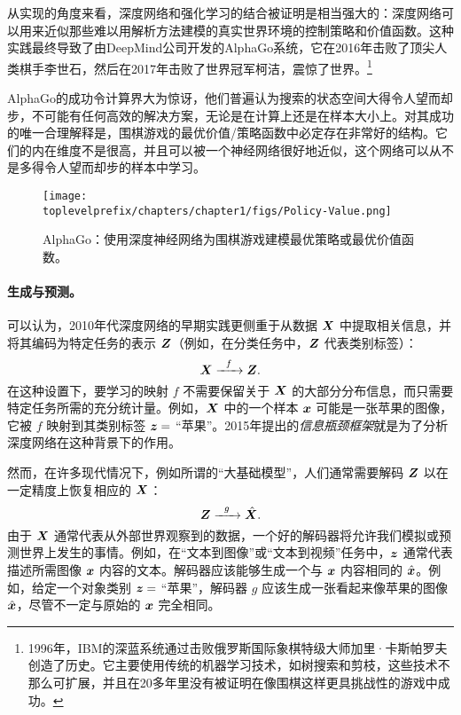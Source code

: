 \documentclass[../../book-main.tex]{subfiles}
\begin{document}
从实现的角度来看，深度网络和强化学习的结合被证明是相当强大的：深度网络可以用来近似那些难以用解析方法建模的真实世界环境的控制策略和价值函数。这种实践最终导致了由DeepMind公司开发的AlphaGo系统，它在2016年击败了顶尖人类棋手李世石，然后在2017年击败了世界冠军柯洁，震惊了世界。\footnote{1996年，IBM的深蓝系统通过击败俄罗斯国际象棋特级大师加里·卡斯帕罗夫创造了历史。它主要使用传统的机器学习技术，如树搜索和剪枝，这些技术不那么可扩展，并且在20多年里没有被证明在像围棋这样更具挑战性的游戏中成功。}

AlphaGo的成功令计算界大为惊讶，他们普遍认为搜索的状态空间大得令人望而却步，不可能有任何高效的解决方案，无论是在计算上还是在样本大小上。对其成功的唯一合理解释是，围棋游戏的最优价值/策略函数中必定存在非常好的结构。它们的内在维度不是很高，并且可以被一个神经网络很好地近似，这个网络可以从不是多得令人望而却步的样本中学习。

\begin{figure}
    \centering
    \texttt{[image: \\toplevelprefix/chapters/chapter1/figs/Policy-Value.png]}
    \caption{AlphaGo：使用深度神经网络为围棋游戏建模最优策略或最优价值函数。}
    \label{fig:Alpha-Go}
\end{figure}

\paragraph{生成与预测。}
可以认为，2010年代深度网络的早期实践更侧重于从数据 $\bm{X}$ 中提取相关信息，并将其编码为特定任务的表示 $\bm{Z}$（例如，在分类任务中，$\bm{Z}$ 代表类别标签）：
\begin{equation}
    \bm{X}   \xrightarrow{\hspace{2mm} f \hspace{2mm}} \bm{Z}.
       \label{eqn:encoding-deep-networks}
\end{equation}
在这种设置下，要学习的映射 $f$ 不需要保留关于 $\bm{X}$ 的大部分分布信息，而只需要特定任务所需的充分统计量。例如，$\bm{X}$ 中的一个样本 $\bm{x}$ 可能是一张苹果的图像，它被 $f$ 映射到其类别标签 $\bm{z} =$ “苹果”。2015年提出的{\em 信息瓶颈框架}\cite{Tishby-ITW2015}就是为了分析深度网络在这种背景下的作用。
 
然而，在许多现代情况下，例如所谓的“大基础模型”，人们通常需要解码 $\bm{Z}$ 以在一定精度上恢复相应的 $\bm{X}$：
\begin{equation}
    \bm{Z}   \xrightarrow{\hspace{2mm} g  \hspace{2mm}} \hat {\bm{X}}.
       \label{eqn:decoding-deep-networks}
\end{equation}
由于 $\bm{X}$ 通常代表从外部世界观察到的数据，一个好的解码器将允许我们模拟或预测世界上发生的事情。例如，在“文本到图像”或“文本到视频”任务中，$\bm{z}$ 通常代表描述所需图像 $\bm{x}$ 内容的文本。解码器应该能够生成一个与 $\bm{x}$ 内容相同的 $\hat {\bm{x}}$。例如，给定一个对象类别 $\bm{z} = $ “苹果”，解码器 $g$ 应该生成一张看起来像苹果的图像 $\hat {\bm{x}}$，尽管不一定与原始的 $\bm{x}$ 完全相同。
\end{document}
